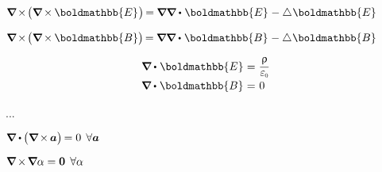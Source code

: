 ${\boldnabla \hspace{-0.2ex} \times \hspace{-0.3ex} \bigl( \boldnabla \hspace{-0.15ex} \times \hspace{-0.1ex} \boldmathbb{E} \hspace{.1ex} \bigr) \hspace{-0.25ex} = \hspace{-0.1ex} \boldnabla \boldnabla \dotp \hspace{.12ex} \boldmathbb{E} \hspace{.1ex} - \Laplacian \hspace{.05ex} \boldmathbb{E}}$

${\boldnabla \hspace{-0.2ex} \times \hspace{-0.3ex} \bigl( \boldnabla \hspace{-0.15ex} \times \hspace{-0.1ex} \boldmathbb{B} \bigr) \hspace{-0.25ex} = \hspace{-0.1ex} \boldnabla \boldnabla \dotp \hspace{.12ex} \boldmathbb{B} \hspace{.1ex} - \Laplacian \hspace{.05ex} \boldmathbb{B}}$

\nopagebreak\begin{equation*}
\begin{array}{r@{\hspace{.3em}}c@{\hspace{.3em}}l}
\boldnabla \dotp \hspace{.12ex} \boldmathbb{E} & = & \displaystyle \frac{\uprho}{\raisemath{.16em}{\vacuumpermittivity}}
\\[.5em]
\boldnabla \dotp \hspace{.12ex} \boldmathbb{B} & = & \hspace{.1ex} 0
\end{array}
\end{equation*}


...

${\boldnabla \dotp \hspace{-0.1ex} \bigl( \boldnabla \hspace{-0.2ex} \times \hspace{-0.16ex} \bm{a} \bigr) \hspace{-0.24ex} = 0 \:\:\forall \bm{a}}$

${\boldnabla \hspace{-0.15ex} \times \hspace{-0.25ex} \boldnabla \alpha = \bm{0} \:\:\forall \alpha}$

